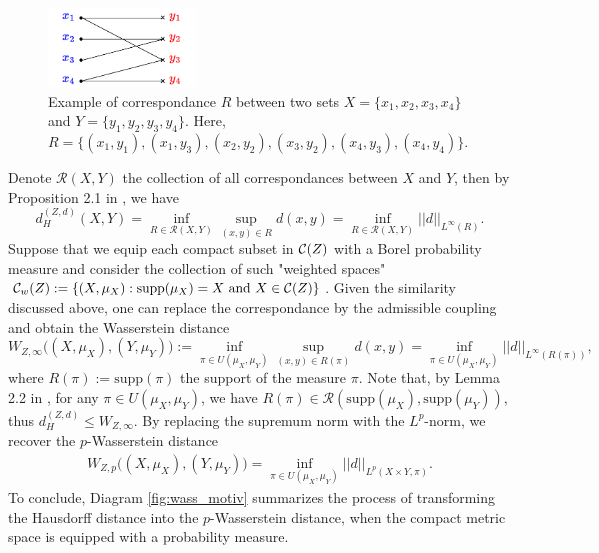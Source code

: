 \begin{figure}[t]
  \centering
  \includegraphics[width=0.35\textwidth,keepaspectratio]{Chapitre1/figures/correspondance.pdf}
  \caption{Example of correspondance $R$ between two sets $X = \{x_1, x_2, x_3, x_4\}$ and
  $Y = \{y_1, y_2, y_3, y_4 \}$. Here,
  $R = \{(x_1, y_1), (x_1, y_3), (x_2, y_2), (x_3, y_2), (x_4, y_3), (x_4, y_4) \}$.}
  \label{fig:correspondance}
\end{figure}
Denote $\mathcal R(X,Y)$ the collection of all correspondances between $X$ and $Y$,
then by Proposition 2.1 in \citep{Memoli11}, we have
\begin{equation} \label{haus_corres}
  d_{H}^{(Z, d)}(X,Y) = \inf_{R \in  \mathcal R(X,Y)} \sup_{(x,y) \in R} d(x,y)
  = \inf_{R \in \mathcal R(X,Y)} \vert\vert d \vert\vert_{L^{\infty}(R)}.
\end{equation}
Suppose that we equip each compact subset in $\mathcal C(Z)$ with a Borel probability measure and consider
the collection of such "weighted spaces"
$\mathcal C_w(Z) := \{(X,\mu_X): \text{supp}(\mu_X) = X \text{ and } X \in \mathcal C(Z) \}$.
Given the similarity discussed above,
one can replace the correspondance by the admissible coupling and obtain the Wasserstein distance
\begin{equation}
  W_{Z, \infty}\big((X,\mu_X), (Y,\mu_Y) \big) :=
  \inf_{\pi \in U(\mu_X, \mu_Y)} \sup_{(x,y) \in R(\pi)} d(x,y)
  = \inf_{\pi \in U(\mu_X, \mu_Y)} \vert\vert d \vert\vert_{L^{\infty}(R(\pi))},
\end{equation}
where $R(\pi) := \text{supp}(\pi)$ the support of the measure $\pi$. Note that,
by Lemma 2.2 in \citep{Memoli11}, for any $\pi \in U(\mu_X, \mu_Y)$, we have
$R(\pi) \in  \mathcal R(\text{supp}(\mu_X), \text{supp}(\mu_Y))$, thus
$d_{H}^{(Z, d)} \leq W_{Z, \infty}$. By replacing the supremum norm with the $L^p$-norm,
we recover the $p$-Wasserstein distance
\begin{align}
    W_{Z, p}\big( (X,\mu_X), (Y,\mu_Y) \big)
    = \inf_{\pi \in U(\mu_X, \mu_Y)} \vert\vert d \vert\vert_{L^p(X \times Y, \pi)}.
\end{align}
To conclude, Diagram \eqref{fig:wass_motiv} summarizes
the process of transforming the Hausdorff distance into the $p$-Wasserstein distance,
when the compact metric space is equipped with a probability measure.
